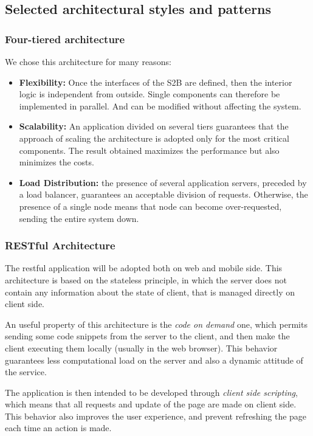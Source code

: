 \subsection{Selected architectural styles and patterns}

\subsubsection{Four-tiered architecture}
We chose this architecture for many reasons:
\begin{itemize}
    \item \textbf{Flexibility:} Once the interfaces of the S2B are defined, then the interior logic is independent from outside. Single components can therefore be implemented in parallel. And can be modified without affecting the system.
    \item \textbf{Scalability:} An application divided on several tiers guarantees that the approach of scaling the architecture is adopted only for the most critical components. The result obtained maximizes the performance but also minimizes the costs.
    \item \textbf{Load Distribution:} the presence of several application servers, preceded by a load balancer, guarantees an acceptable division of requests. Otherwise, the presence of a single node means that node can become over-requested, sending the entire system down.
\end{itemize}

\subsubsection{RESTful Architecture}
\label{REST}
The restful application will be adopted both on web and mobile side. This architecture is based on the stateless principle, in which the server does not contain any information about the state of client, that is managed directly on client side.

An useful property of this architecture is the \textit{code on demand} one, which permits sending some code snippets from the server to the client, and then make the client executing them locally (usually in the web browser). This behavior guarantees less computational load on the server and also a dynamic attitude of the service.

The application is then intended to be developed through \textit{client side scripting}, which means that all requests and update of the page are made on client side. This behavior also improves the user experience, and prevent refreshing the page each time an action is made.

